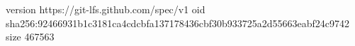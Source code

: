 version https://git-lfs.github.com/spec/v1
oid sha256:92466931b1c3181ca4cdcbfa137178436cbf30b933725a2d55663eabf24c9742
size 467563
